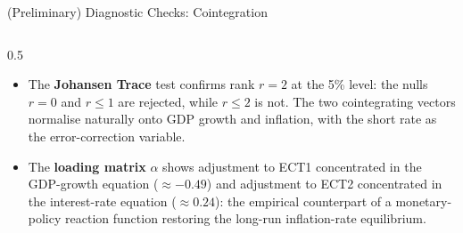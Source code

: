 \documentclass[9pt]{beamer}
\begin{document}
\begin{frame}{(Preliminary) Diagnostic Checks: Cointegration}
\begin{columns}
\begin{column}{0.5\textwidth}
\begin{itemize}
      \item The \textbf{Johansen Trace} test confirms rank $r=2$ at the 5\% level: the nulls $r=0$ and $r \leq 1$ are rejected, while $r \leq 2$ is not. The two cointegrating vectors normalise naturally onto GDP growth and inflation, with the short rate as the error-correction variable.

      \item The \textbf{loading matrix} $\alpha$ shows adjustment to ECT1 concentrated in the GDP-growth equation ($\approx -0.49$) and adjustment to ECT2 concentrated in the interest-rate equation ($\approx 0.24$): the empirical counterpart of a monetary-policy reaction function restoring the long-run inflation-rate equilibrium.
    \end{itemize}
  \end{column}

\end{columns}

\end{frame}


\end{document}
